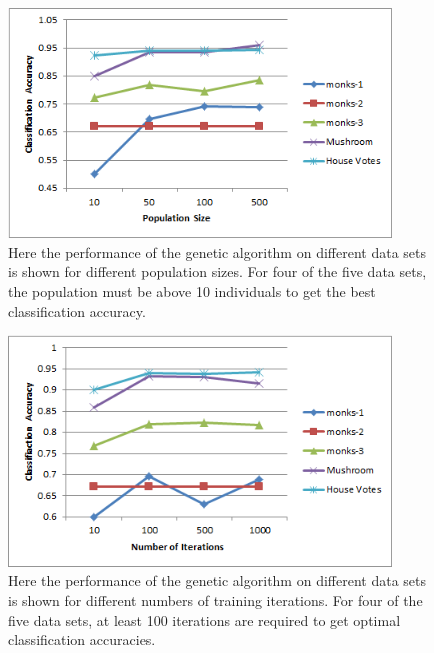 \documentclass[12pt, letterpaper]{article}
\begin{document}
\begin{figure}[!htb]
\begin{center}
\includegraphics[width=4in]{images/population_comparison.png}
\end{center}
\caption{Here the performance of the genetic algorithm on different data sets
is shown for different population sizes.  For four of the five data sets, the
population must be above 10 individuals to get the best classification accuracy.
}
\label{Testing Times of Multiple Decision Trees}
\end{figure}



\begin{figure}[!htb]
\begin{center}
\includegraphics[width=4in]{images/iteration_comparison.png}
\end{center}
\caption{Here the performance of the genetic algorithm on different data sets
is shown for different numbers of training iterations.  For four of the five 
data sets, at least 100 iterations are required to get optimal classification 
accuracies.  
}
\label{Testing Times of Multiple Decision Trees}
\end{figure}
\end{document}
